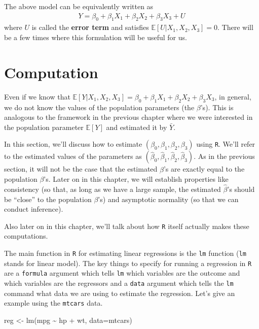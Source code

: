 \documentclass[
  letterpaper,
  DIV=11,
  numbers=noendperiod]{scrreprt}
\newenvironment{Shaded}{\begin{snugshade}}{\end{snugshade}}
\newcommand{\AttributeTok}[1]{\textcolor[rgb]{0.40,0.45,0.13}{#1}}
\newcommand{\FunctionTok}[1]{\textcolor[rgb]{0.28,0.35,0.67}{#1}}
\newcommand{\NormalTok}[1]{\textcolor[rgb]{0.00,0.23,0.31}{#1}}
\newcommand{\OtherTok}[1]{\textcolor[rgb]{0.00,0.23,0.31}{#1}}
\newcommand{\SpecialCharTok}[1]{\textcolor[rgb]{0.37,0.37,0.37}{#1}}
\begin{document}
The above model can be equivalently written as \begin{align*}
  Y = \beta_0 + \beta_1 X_1 + \beta_2 X_2 + \beta_3 X_3 + U
\end{align*} where \(U\) is called the \textbf{error term} and satisfies
\(\mathbb{E}[U|X_1,X_2,X_3] = 0\). There will be a few times where this
formulation will be useful for us.

\section{Computation}\label{computation}

Even if we know that
\(\mathbb{E}[Y|X_1,X_2,X_3] = \beta_0 + \beta_1 X_1 + \beta_2 X_2 + \beta_3 X_3\),
in general, we do not know the values of the population parameters (the
\(\beta\)'s). This is analogous to the framework in the previous chapter
where we were interested in the population parameter \(\mathbb{E}[Y]\)
and estimated it by \(\bar{Y}\).

In this section, we'll discuss how to estimate
\((\beta_0,\beta_1,\beta_2,\beta_3)\) using \texttt{R}. We'll refer to
the estimated values of the parameters as
\((\hat{\beta}_0, \hat{\beta}_1, \hat{\beta}_2, \hat{\beta}_3)\). As in
the previous section, it will not be the case that the estimated
\(\hat{\beta}\)'s are exactly equal to the population \(\beta\)'s. Later
on in this chapter, we will establish properties like consistency (so
that, as long as we have a large sample, the estimated \(\hat{\beta}\)'s
should be ``close'' to the population \(\beta\)'s) and asymptotic
normality (so that we can conduct inference).

Also later on in this chapter, we'll talk about how \texttt{R} itself
actually makes these computations.

The main function in \texttt{R} for estimating linear regressions is the
\texttt{lm} function (\texttt{lm} stands for linear model). The key
things to specify for running a regression in \texttt{R} are a
\texttt{formula} argument which tells \texttt{lm} which variables are
the outcome and which variables are the regressors and a \texttt{data}
argument which tells the \texttt{lm} command what data we are using to
estimate the regression. Let's give an example using the \texttt{mtcars}
data.

\begin{Shaded}
\begin{Highlighting}[]
\NormalTok{reg }\OtherTok{\textless{}{-}} \FunctionTok{lm}\NormalTok{(mpg }\SpecialCharTok{\textasciitilde{}}\NormalTok{ hp }\SpecialCharTok{+}\NormalTok{ wt, }\AttributeTok{data=}\NormalTok{mtcars)}
\end{Highlighting}
\end{Shaded}
\end{document}
